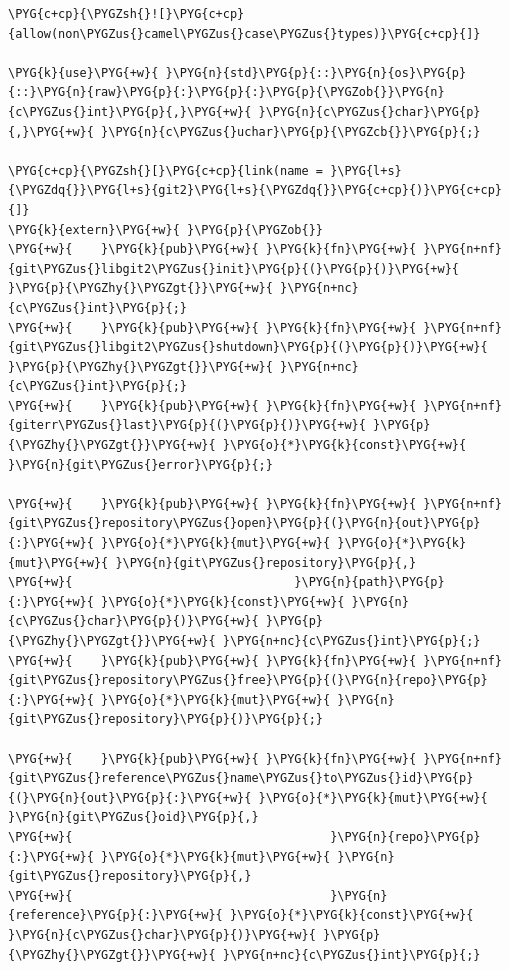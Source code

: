 \begin{Verbatim}[commandchars=\\\{\},breaklines=true,breakanywhere=true,fontsize=\codefont,xleftmargin=17bp]
\PYG{c+cp}{\PYGZsh{}![}\PYG{c+cp}{allow(non\PYGZus{}camel\PYGZus{}case\PYGZus{}types)}\PYG{c+cp}{]}

\PYG{k}{use}\PYG{+w}{ }\PYG{n}{std}\PYG{p}{::}\PYG{n}{os}\PYG{p}{::}\PYG{n}{raw}\PYG{p}{:}\PYG{p}{:}\PYG{p}{\PYGZob{}}\PYG{n}{c\PYGZus{}int}\PYG{p}{,}\PYG{+w}{ }\PYG{n}{c\PYGZus{}char}\PYG{p}{,}\PYG{+w}{ }\PYG{n}{c\PYGZus{}uchar}\PYG{p}{\PYGZcb{}}\PYG{p}{;}

\PYG{c+cp}{\PYGZsh{}[}\PYG{c+cp}{link(name = }\PYG{l+s}{\PYGZdq{}}\PYG{l+s}{git2}\PYG{l+s}{\PYGZdq{}}\PYG{c+cp}{)}\PYG{c+cp}{]}
\PYG{k}{extern}\PYG{+w}{ }\PYG{p}{\PYGZob{}}
\PYG{+w}{    }\PYG{k}{pub}\PYG{+w}{ }\PYG{k}{fn}\PYG{+w}{ }\PYG{n+nf}{git\PYGZus{}libgit2\PYGZus{}init}\PYG{p}{(}\PYG{p}{)}\PYG{+w}{ }\PYG{p}{\PYGZhy{}\PYGZgt{}}\PYG{+w}{ }\PYG{n+nc}{c\PYGZus{}int}\PYG{p}{;}
\PYG{+w}{    }\PYG{k}{pub}\PYG{+w}{ }\PYG{k}{fn}\PYG{+w}{ }\PYG{n+nf}{git\PYGZus{}libgit2\PYGZus{}shutdown}\PYG{p}{(}\PYG{p}{)}\PYG{+w}{ }\PYG{p}{\PYGZhy{}\PYGZgt{}}\PYG{+w}{ }\PYG{n+nc}{c\PYGZus{}int}\PYG{p}{;}
\PYG{+w}{    }\PYG{k}{pub}\PYG{+w}{ }\PYG{k}{fn}\PYG{+w}{ }\PYG{n+nf}{giterr\PYGZus{}last}\PYG{p}{(}\PYG{p}{)}\PYG{+w}{ }\PYG{p}{\PYGZhy{}\PYGZgt{}}\PYG{+w}{ }\PYG{o}{*}\PYG{k}{const}\PYG{+w}{ }\PYG{n}{git\PYGZus{}error}\PYG{p}{;}

\PYG{+w}{    }\PYG{k}{pub}\PYG{+w}{ }\PYG{k}{fn}\PYG{+w}{ }\PYG{n+nf}{git\PYGZus{}repository\PYGZus{}open}\PYG{p}{(}\PYG{n}{out}\PYG{p}{:}\PYG{+w}{ }\PYG{o}{*}\PYG{k}{mut}\PYG{+w}{ }\PYG{o}{*}\PYG{k}{mut}\PYG{+w}{ }\PYG{n}{git\PYGZus{}repository}\PYG{p}{,}
\PYG{+w}{                               }\PYG{n}{path}\PYG{p}{:}\PYG{+w}{ }\PYG{o}{*}\PYG{k}{const}\PYG{+w}{ }\PYG{n}{c\PYGZus{}char}\PYG{p}{)}\PYG{+w}{ }\PYG{p}{\PYGZhy{}\PYGZgt{}}\PYG{+w}{ }\PYG{n+nc}{c\PYGZus{}int}\PYG{p}{;}
\PYG{+w}{    }\PYG{k}{pub}\PYG{+w}{ }\PYG{k}{fn}\PYG{+w}{ }\PYG{n+nf}{git\PYGZus{}repository\PYGZus{}free}\PYG{p}{(}\PYG{n}{repo}\PYG{p}{:}\PYG{+w}{ }\PYG{o}{*}\PYG{k}{mut}\PYG{+w}{ }\PYG{n}{git\PYGZus{}repository}\PYG{p}{)}\PYG{p}{;}

\PYG{+w}{    }\PYG{k}{pub}\PYG{+w}{ }\PYG{k}{fn}\PYG{+w}{ }\PYG{n+nf}{git\PYGZus{}reference\PYGZus{}name\PYGZus{}to\PYGZus{}id}\PYG{p}{(}\PYG{n}{out}\PYG{p}{:}\PYG{+w}{ }\PYG{o}{*}\PYG{k}{mut}\PYG{+w}{ }\PYG{n}{git\PYGZus{}oid}\PYG{p}{,}
\PYG{+w}{                                    }\PYG{n}{repo}\PYG{p}{:}\PYG{+w}{ }\PYG{o}{*}\PYG{k}{mut}\PYG{+w}{ }\PYG{n}{git\PYGZus{}repository}\PYG{p}{,}
\PYG{+w}{                                    }\PYG{n}{reference}\PYG{p}{:}\PYG{+w}{ }\PYG{o}{*}\PYG{k}{const}\PYG{+w}{ }\PYG{n}{c\PYGZus{}char}\PYG{p}{)}\PYG{+w}{ }\PYG{p}{\PYGZhy{}\PYGZgt{}}\PYG{+w}{ }\PYG{n+nc}{c\PYGZus{}int}\PYG{p}{;}


\end{Verbatim}
